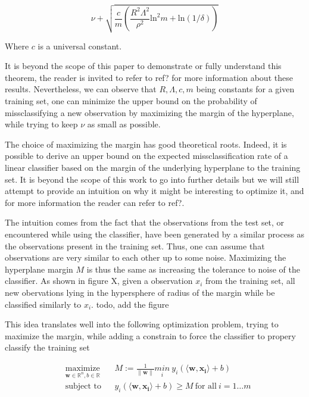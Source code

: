\begin{equation}
  \nu + \sqrt{\frac{c}{m}\left(\frac{R^2\Lambda^2}{\rho^2}\text{ln}^2m + \text{ln}(1/\delta)\right)}
\end{equation}

Where $c$ is a universal constant.

It is beyond the scope of this paper to demonstrate or fully understand this theorem, the reader is invited to refer to \textcolor[rgb]{1,0,0}{ref?} for more information about these results. Nevertheless, we can observe that $R, \Lambda, c, m$ being constants for a given training set, one can minimize the upper bound on the probability of missclassifying a new observation by maximizing the margin of the hyperplane, while trying to keep $\nu$ as small as possible.
\fi

The choice of maximizing the margin has good theoretical roots. Indeed, it is possible to derive an upper bound on the expected missclassification rate of a linear classifier based on the margin of the underlying hyperplane to the training set. It is beyond the scope of this work to go into further details but we will still attempt to provide an intuition on why it might be interesting to optimize it, and for more information the reader can refer to  \textcolor[rgb]{1,0,0}{ref?}.

The intuition comes from the fact that the observations from the test set, or encountered while using the classifier, have been generated by a similar process as the observations present in the training set. Thus, one can assume that observations are very similar to each other up to some noise. Maximizing the hyperplane margin
$M$ is thus the same as increasing the tolerance to noise of the classifier. As shown in figure X, given a observation $x_i$ from the training set, all new obervations lying in the hypersphere of radius of the margin while be classified similarly to $x_i$.  \textcolor[rgb]{1,0,0}{todo, add the figure}

This idea translates well into the following optimization problem, trying to maximize the margin, while adding a constrain to force the classifier to propery classify the training set

\begin{equation}
  \begin{aligned}
    &\underset{\mathbf{w} \in \mathbb{R}^n, b \in \mathbb{R}} {\text{maximize}}
    & & M := \frac{1}{\|\mathbf{w}\|} \underset{i} {min}\ 
    y_i(\langle\mathbf{w},\mathbf{x_i}\rangle + b)\\
    &\text{subject to}
    & &y_i(\langle\mathbf{w},\mathbf{x_i}\rangle + b) \ge M\ \text{for all}\ i = 1 \dotsc m
  \end{aligned}
\end{equation}

